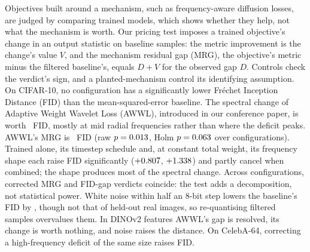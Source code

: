 Objectives built around a mechanism, such as frequency-aware diffusion losses,
are judged by comparing trained models, which shows whether they help, not
what the mechanism is worth. Our pricing test imposes a trained
objective's change in an output statistic on baseline samples: the metric
improvement is the change's value $V$, and the mechanism residual gap (MRG),
the objective's metric minus the filtered baseline's, equals $D + V$ for the
observed gap $D$. Controls check the verdict's sign, and a planted-mechanism control its
identifying assumption. On CIFAR-10, no
configuration has a significantly lower Fr\'echet Inception Distance (FID)
than the mean-squared-error baseline. The spectral change of Adaptive Weight
Wavelet Loss (AWWL), introduced in our conference paper, is worth
\priceTransplantValue{}~FID, mostly at mid radial frequencies rather than
where the deficit peaks. AWWL's MRG is \mrgMain{}~FID (raw
$p = 0.013$, Holm $p = 0.063$ over \nFamilyPricing{}
configurations). Trained alone, its timestep schedule and, at constant total
weight, its frequency shape each raise FID significantly ($+0.807$,
$+1.338$) and partly cancel when combined; the shape produces most of
the spectral change. Across configurations, corrected MRG and FID-gap
verdicts coincide: the test adds a decomposition, not statistical power.
White noise within half an 8-bit step lowers the baseline's FID by
\priceNoiseHalfValue{}, though not that of held-out real images, so
re-quantising filtered samples overvalues them. In DINOv2 features AWWL's gap
is resolved, its change is worth nothing, and noise raises the distance. On CelebA-64, correcting a high-frequency
deficit of the same size raises FID.
